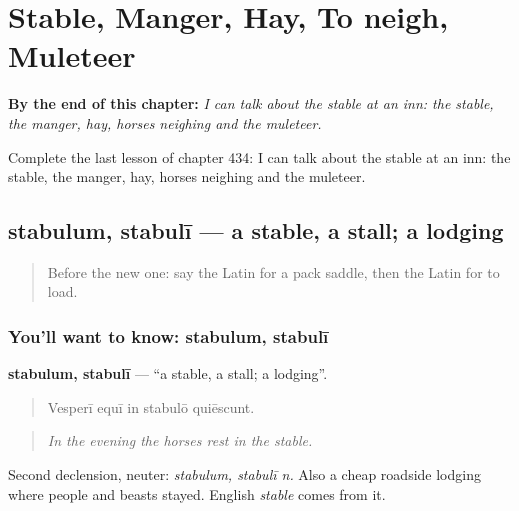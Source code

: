 
\chapter{Stable, Manger, Hay, To neigh, Muleteer}
\label{ch:la-stable-manger-hay-to-neigh-muleteer}

\begin{chapteropening}
\textbf{By the end of this chapter:} \emph{I can talk about the stable at an inn: the stable, the manger, hay, horses neighing and the muleteer.}

Complete the last lesson of chapter 434: I can talk about the stable at an inn: the stable, the manger, hay, horses neighing and the muleteer.
\end{chapteropening}

\section[stabulum, stabulī]{stabulum, stabulī — a stable, a stall; a lodging}

\label{lesson:LA-C434-stabulum}



\begin{quote}
Before the new one: say the Latin for a pack saddle, then the Latin for to load.
\end{quote}

\subsection*{You'll want to know: stabulum, stabulī}
\textbf{stabulum, stabulī} — \textquotedblleft{}a stable, a stall; a lodging\textquotedblright{}.

\begin{quote}
Vesperī equī in stabulō quiēscunt.
\end{quote}

\begin{quote}
\emph{In the evening the horses rest in the stable.}
\end{quote}

Second declension, neuter: \emph{stabulum, stabulī n.} Also a cheap roadside lodging where people and beasts stayed. English \emph{stable} comes from it.

